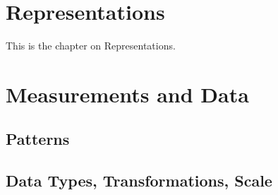 \documentclass[../../LabBook]{subfiles}
\begin{document}
\section{Representations}

This is the chapter on Representations.

\section{Measurements and Data}
\subsection{Patterns}
\subsection{Data Types, Transformations, Scale}
\end{document}
